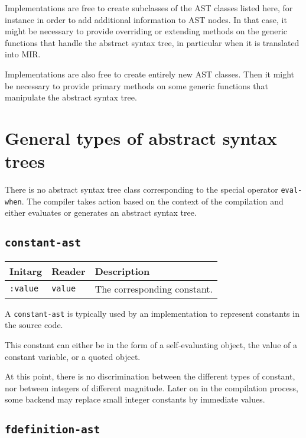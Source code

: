 Implementations are free to create subclasses of the AST classes
listed here, for instance in order to add additional information to
AST nodes.  In that case, it might be necessary to provide overriding
or extending methods on the generic functions that handle the abstract
syntax tree, in particular when it is translated into MIR.  

Implementations are also free to create entirely new AST classes.
Then it might be necessary to provide primary methods on some generic
functions that manipulate the abstract syntax tree.%

\section{General types of abstract syntax trees}

There is no abstract syntax tree class corresponding to the special
operator \texttt{eval-when}.  The compiler takes action based on the
context of the compilation and either evaluates or generates an
abstract syntax tree.

\subsection{\texttt{constant-ast}}
\label{constant-ast}

\begin{tabular}{|l|l|l|}
\hline
Initarg & Reader & Description\\
\hline\hline
\texttt{:value} & \texttt{value} & The corresponding constant.\\
\hline
\end{tabular}

A \texttt{constant-ast} is typically used by an implementation to
represent constants in the source code.

This constant can either be in the form of a self-evaluating object,
the value of a constant variable, or a quoted object.

At this point, there is no discrimination between the different types
of constant, nor between integers of different magnitude.  Later on
in the compilation process, some backend may replace small integer
constants by immediate values. 

\subsection{\texttt{fdefinition-ast}}
\label{fdefinition-ast}

